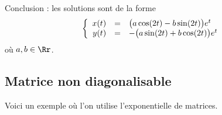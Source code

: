 \documentclass[12pt, class=report,crop=false]{standalone}
\begin{document}
\begin{exemple}
Conclusion : les solutions sont de la forme 
$$\left\{\begin{array}{rcl}
x(t) &=& \big(a\cos(2t) - b\sin(2t) \big)  e^t\cr  
y(t) &=& -\big(a\sin(2t) + b\cos(2t) \big)  e^t
\end{array}\right.$$
où $a, b \in \Rr$.


\end{exemple}


\subsection{Matrice non diagonalisable}

Voici un exemple où l'on utilise l'exponentielle de matrices.
\end{document}
